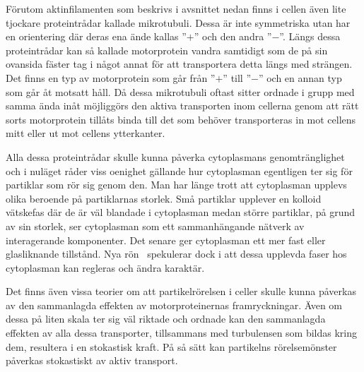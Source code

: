 Förutom aktinfilamenten som beskrivs i avsnittet nedan finns i cellen även lite tjockare proteintrådar kallade mikrotubuli. Dessa är inte symmetriska utan har en orientering där deras ena ände kallas ''$+$'' och den andra ''$-$''. Längs dessa proteintrådar kan så kallade motorprotein vandra samtidigt som de på sin ovansida fäster tag i något annat för att transportera detta längs med strängen. Det finns en typ av motorprotein som går från ''$+$'' till ''$-$'' och en annan typ som går åt motsatt håll. Då dessa mikrotubuli oftast sitter ordnade i grupp med samma ända inåt möjliggörs den aktiva transporten inom cellerna genom att rätt sorts motorprotein tillåts binda till det som behöver transporteras in mot cellens mitt eller ut mot cellens ytterkanter. 


Alla dessa proteintrådar skulle kunna påverka cytoplasmans genomtränglighet och i nuläget råder viss oenighet gällande hur cytoplasman egentligen ter sig för partiklar som rör sig genom den. Man har länge trott att cytoplasman upplevs olika beroende på partiklarnas storlek. Små partiklar upplever en kolloid vätskefas där de är väl blandade i cytoplasman medan större partiklar, på grund av sin storlek, ser cytoplasman som ett sammanhängande nätverk av interagerande komponenter. Det senare ger cytoplasman ett mer fast eller glasliknande tillstånd. Nya rön~\cite{Parry_etal2014} spekulerar dock i att dessa upplevda faser hos cytoplasman kan regleras och ändra karaktär.

Det finns även vissa teorier om att partikelrörelsen i celler skulle kunna påverkas av den sammanlagda effekten av motorproteinernas framryckningar. Även om dessa på liten skala ter sig väl riktade och ordnade kan den sammanlagda effekten av alla dessa transporter, tillsammans med turbulensen som bildas kring dem, resultera i en stokastisk kraft. På så sätt kan partikelns rörelsemönster påverkas stokastiskt av aktiv transport. 


